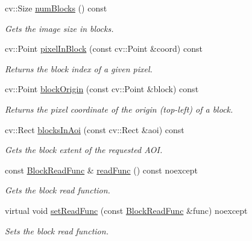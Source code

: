 \begin{DoxyCompactItemize}
cv\+::\+Size \hyperlink{classdg_1_1deepcore_1_1imagery_1_1_geo_image_a1a2b00ab6845886d12ff94208c6346f4}{num\+Blocks} () const 
\begin{DoxyCompactList}\small\item\em Gets the image size in blocks. \end{DoxyCompactList}\item 
cv\+::\+Point \hyperlink{classdg_1_1deepcore_1_1imagery_1_1_geo_image_a165175d4aa1815f4bcce682d2865cc4c}{pixel\+In\+Block} (const cv\+::\+Point \&coord) const 
\begin{DoxyCompactList}\small\item\em Returns the block index of a given pixel. \end{DoxyCompactList}\item 
cv\+::\+Point \hyperlink{classdg_1_1deepcore_1_1imagery_1_1_geo_image_ad72081ed6e1a4e51c904a191f2a2ff61}{block\+Origin} (const cv\+::\+Point \&block) const 
\begin{DoxyCompactList}\small\item\em Returns the pixel coordinate of the origin (top-\/left) of a block. \end{DoxyCompactList}\item 
cv\+::\+Rect \hyperlink{classdg_1_1deepcore_1_1imagery_1_1_geo_image_ab023b52d32e825962b6474416b390870}{blocks\+In\+Aoi} (const cv\+::\+Rect \&aoi) const 
\begin{DoxyCompactList}\small\item\em Gets the block extent of the requested A\+OI. \end{DoxyCompactList}\item 
const \hyperlink{group___imagery_module_ga2238c2ef34502f68956ddef1f477ad95}{Block\+Read\+Func} \& \hyperlink{classdg_1_1deepcore_1_1imagery_1_1_geo_image_a2eb4fdc320aee10e8afd337138e2e7e1}{read\+Func} () const noexcept
\begin{DoxyCompactList}\small\item\em Gets the block read function. \end{DoxyCompactList}\item 
virtual void \hyperlink{classdg_1_1deepcore_1_1imagery_1_1_geo_image_af836dcf21d949fd76993485242317d8f}{set\+Read\+Func} (const \hyperlink{group___imagery_module_ga2238c2ef34502f68956ddef1f477ad95}{Block\+Read\+Func} \&func) noexcept
\begin{DoxyCompactList}\small\item\em Sets the block read function. \end{DoxyCompactList}\item 

\end{DoxyCompactItemize}
